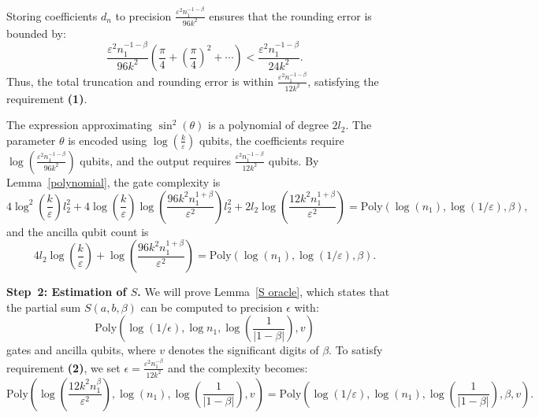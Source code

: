 \documentclass[aps,pra,twocolumn,superscriptaddress,preprintnumbers,amsmath,amssymb]{revtex4-2}
\begin{document}
Storing coefficients \( d_n \) to precision \( \frac{\varepsilon^2 n_1^{-1-\beta}}{96k^2} \) ensures that the rounding error is bounded by:
\begin{equation}
    \frac{\varepsilon^2n_1^{-1-\beta}}{96k^2}(\frac{\pi}{4}+(\frac{\pi}{4})^2+\cdots)<\frac{\varepsilon^2n_1^{-1-\beta}}{24k^2}.
\end{equation}
Thus, the total truncation and rounding error is within $\frac{\varepsilon^2 n_1^{-1-\beta}}{12k^2}$, satisfying the requirement \textbf{(1)}.\par
The expression approximating \( \sin^2(\theta) \) is a polynomial of degree \( 2l_2 \). The parameter \( \theta \) is encoded using \( \log\left(\frac{k}{\varepsilon}\right) \) qubits, the coefficients require \( \log\left(\frac{\varepsilon^2 n_1^{-1-\beta}}{96k^2}\right) \) qubits, and the output requires \( \frac{\varepsilon^2 n_1^{-1-\beta}}{12k^2} \) qubits.
By Lemma~\ref{polynomial}, the gate complexity is
 \begin{equation}\label{step1,1}
     4\log^2(\frac{k}{\varepsilon})l_2^2+4\log(\frac{k}{\varepsilon})\log(\frac{96k^2n_1^{1+\beta}}{\varepsilon^2})l_2^2+2l_2\log(\frac{12k^2n_1^{1+\beta}}{\varepsilon^2})=\mathrm{Poly}(\log(n_1),\log(1/\varepsilon),\beta),
 \end{equation}
and the ancilla qubit count is
\begin{equation}\label{step1,2}
4l_2\log(\frac{k}{\varepsilon})+\log(\frac{96k^2n_1^{1+\beta}}{\varepsilon^2})=\mathrm{Poly}(\log(n_1),\log(1/\varepsilon),\beta).
\end{equation}
\par
\textbf{Step~2: Estimation of \boldmath$S$.} 
We will prove Lemma~\ref{S oracle}, which states that the partial sum \( S(a, b, \beta) \) can be computed to precision \( \epsilon \) with:
\begin{equation}\label{step2}
\mathrm{Poly}\left( \log(1/\epsilon), \log n_1, \log \left( \frac{1}{|1 - \beta|} \right),v \right)
\end{equation}
gates and ancilla qubits,  where \( v \) denotes the significant digits of \( \beta \). To satisfy requirement \textbf{(2)}, we set \( \epsilon = \frac{\varepsilon^2 n_1^{-\beta}}{12k^2} \) and the complexity becomes:
\[
\mathrm{Poly}\left( \log \left( \frac{12k^2 n_1^{\beta}}{\varepsilon^2} \right), \log (n_1), \log \left( \frac{1}{|1 - \beta|} \right),v \right) = \mathrm{Poly}\left( \log(1/\varepsilon), \log (n_1), \log \left( \frac{1}{|1 - \beta|} \right), \beta,v\right).
\] \par
\end{document}
